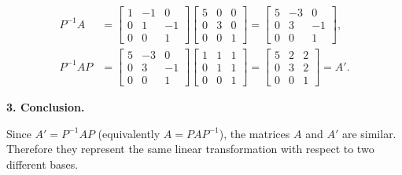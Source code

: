 \documentclass{report}
\begin{document}
{    \[
        \begin{aligned}
            P^{-1}A
             & =\begin{bmatrix}
                    1 & -1 & 0  \\
                    0 & 1  & -1 \\
                    0 & 0  & 1
                \end{bmatrix}
            \begin{bmatrix}
                5 & 0 & 0 \\
                0 & 3 & 0 \\
                0 & 0 & 1
            \end{bmatrix}
            =\begin{bmatrix}
                 5 & -3 & 0  \\
                 0 & 3  & -1 \\
                 0 & 0  & 1
             \end{bmatrix},    \\[10pt]
            P^{-1}AP
             & =\begin{bmatrix}
                    5 & -3 & 0  \\
                    0 & 3  & -1 \\
                    0 & 0  & 1
                \end{bmatrix}
            \begin{bmatrix}
                1 & 1 & 1 \\
                0 & 1 & 1 \\
                0 & 0 & 1
            \end{bmatrix}
            =\begin{bmatrix}
                 5 & 2 & 2 \\
                 0 & 3 & 2 \\
                 0 & 0 & 1
             \end{bmatrix}
            =A'.
        \end{aligned}
    \]

    \textbf{3.  Conclusion.}

    Since \(A' = P^{-1}AP\) (equivalently \(A = PAP^{-1}\)), the matrices \(A\) and
    \(A'\) are similar. Therefore they represent the same linear transformation
    with respect to two different bases.

}

\end{document}
